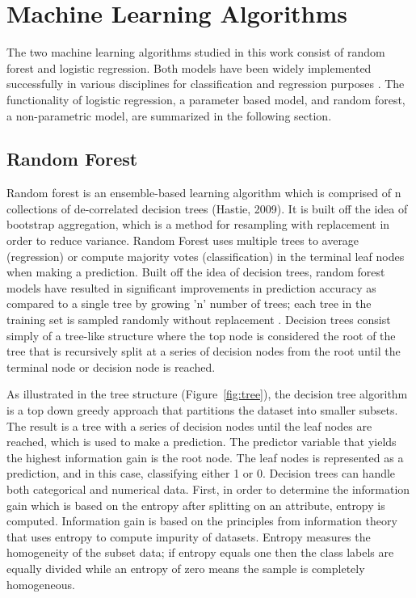 \documentclass{llncs}
\begin{document}
\section{Machine Learning Algorithms}

\noindent 
The two machine learning algorithms studied in this work consist of random forest and logistic regression. Both models have been widely implemented successfully in various disciplines for classification and regression purposes \cite{couronne}. The functionality of logistic regression, a parameter based model, and random forest, a non-parametric model, are summarized in the following section. 

\subsection{Random Forest}

\noindent 
Random forest is an ensemble-based learning algorithm which is comprised of n collections of de-correlated decision trees (Hastie, 2009). It is built off the idea of bootstrap aggregation, which is a method for resampling with replacement in order to reduce variance. Random Forest uses multiple trees to average (regression) or compute majority votes (classification) in the terminal leaf nodes when making a prediction. Built off the idea of decision trees, random forest models have resulted in significant improvements in prediction accuracy as compared to a single tree by growing 'n' number of trees; each tree in the training set is sampled randomly without replacement \cite{breiman}. Decision trees consist simply of a tree-like structure where the top node is considered the root of the tree that is recursively split at a series of decision nodes from the root until the terminal node or decision node is reached. 

\noindent 
As illustrated in the tree structure (Figure~\ref{fig:tree}), the decision tree algorithm is a top down greedy approach that partitions the dataset into smaller subsets. The result is a tree with a series of decision nodes until the leaf nodes are reached, which is used to make a prediction. The predictor variable that yields the highest information gain is the root node. The leaf nodes is represented as a prediction, and in this case, classifying either 1 or 0. Decision trees can handle both categorical and numerical data. First, in order to determine the information gain which is based on the entropy after splitting on an attribute, entropy is computed. Information gain is based on the principles from information theory that uses entropy to compute impurity of datasets. Entropy measures the homogeneity of the subset data; if entropy equals one then the class labels are equally divided while an entropy of zero means the sample is completely homogeneous. 
\end{document}
